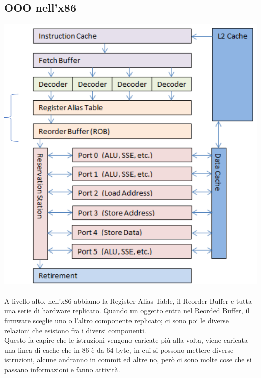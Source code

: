 \documentclass[14pt]{article}
\begin{document}
\subsection{OOO nell'x86}
\includegraphics[scale=0.3]{immagini/x86-ooo}\\\\
A livello alto, nell'x86 abbiamo la Register Alias Table, il Reorder Buffer e tutta una serie di hardware replicato. Quando un oggetto entra nel Reorded Buffer, il firmware sceglie uno o l'altro componente replicato; ci sono poi le diverse relazioni che esistono fra i diversi componenti.\\ Questo fa capire che le istruzioni vengono caricate più alla volta, viene caricata una linea di cache che in 86 è da 64 byte, in cui si possono mettere diverse istruzioni, alcune andranno in commit ed altre no, però ci sono molte cose che si passano informazioni e fanno attività.
\end{document}
